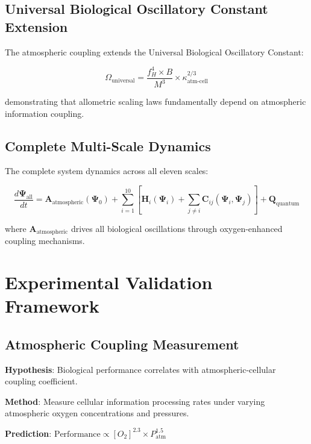 \documentclass[twocolumn]{article}
\begin{document}
\subsection{Universal Biological Oscillatory Constant Extension}

The atmospheric coupling extends the Universal Biological Oscillatory Constant:

\begin{equation}
\Omega_{\text{universal}} = \frac{f_H^4 \times B}{M^3} \times \kappa_{\text{atm-cell}}^{2/3}
\end{equation}

demonstrating that allometric scaling laws fundamentally depend on atmospheric information coupling.

\subsection{Complete Multi-Scale Dynamics}

The complete system dynamics across all eleven scales:

\begin{equation}
\frac{d\mathbf{\Psi}_{\text{all}}}{dt} = \mathbf{A}_{\text{atmospheric}}(\mathbf{\Psi}_0) + \sum_{i=1}^{10} \left[\mathbf{H}_i(\mathbf{\Psi}_i) + \sum_{j \neq i} \mathbf{C}_{ij}(\mathbf{\Psi}_i, \mathbf{\Psi}_j)\right] + \mathbf{Q}_{\text{quantum}}
\end{equation}

where $\mathbf{A}_{\text{atmospheric}}$ drives all biological oscillations through oxygen-enhanced coupling mechanisms.

\section{Experimental Validation Framework}

\subsection{Atmospheric Coupling Measurement}

\textbf{Hypothesis}: Biological performance correlates with atmospheric-cellular coupling coefficient.

\textbf{Method}: Measure cellular information processing rates under varying atmospheric oxygen concentrations and pressures.

\textbf{Prediction}: $\text{Performance} \propto [O_2]^{2.3} \times P_{\text{atm}}^{1.5}$
\end{document}
